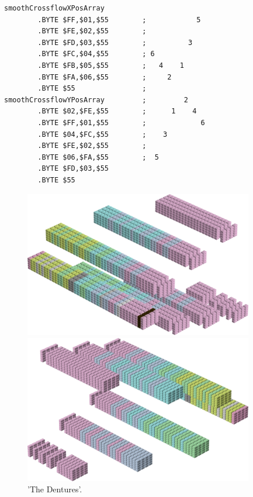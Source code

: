 \begin{minipage}[b]{0.48\linewidth}
\begin{lrbox}{\mybox}%
\begin{lstlisting}[basicstyle=\ttfamily\tiny,escapechar=\%]
smoothCrossflowXPosArray
        .BYTE $FF,$01,$55        ;            5
        .BYTE $FE,$02,$55        ;              
        .BYTE $FD,$03,$55        ;          3   
        .BYTE $FC,$04,$55        ; 6            
        .BYTE $FB,$05,$55        ;   4    1     
        .BYTE $FA,$06,$55        ;     2        
        .BYTE $55                ;              
smoothCrossflowYPosArray         ;         2    
        .BYTE $02,$FE,$55        ;      1    4  
        .BYTE $FF,$01,$55        ;             6
        .BYTE $04,$FC,$55        ;    3         
        .BYTE $FE,$02,$55        ;              
        .BYTE $06,$FA,$55        ;  5           
        .BYTE $FD,$03,$55
        .BYTE $55
\end{lstlisting}
\end{lrbox}%
\scalebox{0.8}{\usebox{\mybox}}

\end{minipage}
%
%
\begin{minipage}[b]{0.48\linewidth}
\vspace{1cm}
\begin{figure}[H]
    \centering
    \begin{adjustbox}{width=5cm,margin=0cm 0cm}
      \includegraphics[width=10cm]{src/colorspace_patterns/pattern2-45.png}%
    \end{adjustbox}
    \begin{adjustbox}{width=5cm,margin=0cm 0cm}
      \includegraphics[width=10cm]{src/colorspace_patterns/pattern2-225.png}%
    \end{adjustbox}
\caption{'The Dentures'.}
\end{figure}
\end{minipage}

